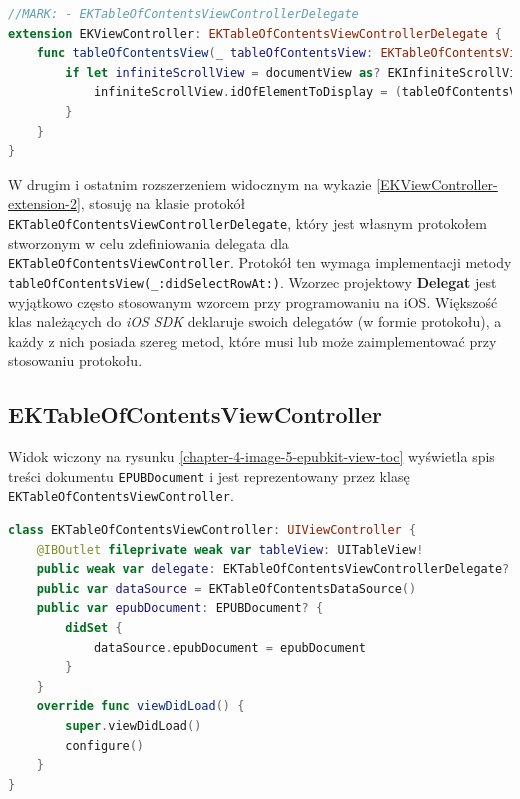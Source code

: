 \begin{lstlisting}[language=swift,caption={Rozszerzenie klasy texttt{EKViewController} o protokół texttt{EKTableOfContentsViewControllerDelegate}},label=EKViewController-extension-2]
//MARK: - EKTableOfContentsViewControllerDelegate
extension EKViewController: EKTableOfContentsViewControllerDelegate {
    func tableOfContentsView(_ tableOfContentsView: EKTableOfContentsViewController, didSelectRowAt indexPath: IndexPath) {
        if let infiniteScrollView = documentView as? EKInfiniteScrollView {
            infiniteScrollView.idOfElementToDisplay = (tableOfContentsView.dataSource.item(at: indexPath) as? EKTableOfContentsDataSource.Item)?.item
        }
    }
}
\end{lstlisting}

W drugim i ostatnim rozszerzeniem widocznym na wykazie \ref{EKViewController-extension-2}, stosuję na klasie protokół \texttt{EKTableOfContentsViewControllerDelegate}, który jest własnym protokołem stworzonym w celu zdefiniowania delegata dla \texttt{EKTableOfContentsViewController}. Protokół ten wymaga implementacji metody \texttt{tableOfContentsView(\_:didSelectRowAt:)}. Wzorzec projektowy \textbf{Delegat} jest wyjątkowo często stosowanym wzorcem przy programowaniu na iOS. Większość klas należących do \textit{iOS SDK} deklaruje swoich delegatów (w formie protokołu), a każdy z nich posiada szereg metod, które musi lub może zaimplementować przy stosowaniu protokołu.

\subsection{EKTableOfContentsViewController}

Widok wiczony na rysunku \ref{chapter-4-image-5-epubkit-view-toc} wyświetla spis treści dokumentu \texttt{EPUBDocument} i jest reprezentowany przez klasę \texttt{EKTableOfContentsViewController}.

\begin{lstlisting}[language=swift,caption={Deklaracja klasy \texttt{EKTableOfContentsViewController}},label=EKTableOfContentsViewController-declaration]
class EKTableOfContentsViewController: UIViewController {
    @IBOutlet fileprivate weak var tableView: UITableView!
    public weak var delegate: EKTableOfContentsViewControllerDelegate?
    public var dataSource = EKTableOfContentsDataSource()
    public var epubDocument: EPUBDocument? {
        didSet {
            dataSource.epubDocument = epubDocument
        }
    }
    override func viewDidLoad() {
        super.viewDidLoad()
        configure()
    }
}
\end{lstlisting}

